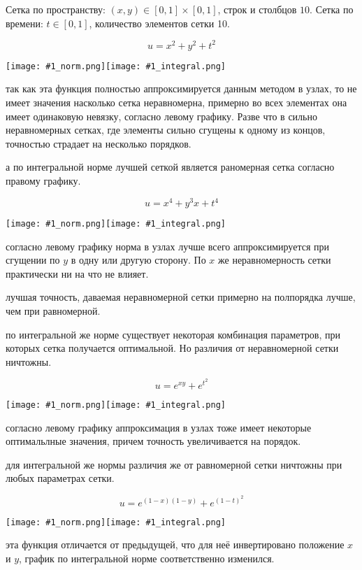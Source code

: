 Сетка по пространству: $ (x, y) \in [0, 1] \times [0, 1] $, строк и столбцов $10$. Сетка по времени: $ t \in [0, 1] $, количество элементов сетки 10.

\newcommand{\includetwoimages}[1]{
\noindent\texttt{[image: \#1\_norm.png]}\texttt{[image: \#1\_integral.png]}
}

$$ u = x^2 + y^2 + t^2 $$

\includetwoimages{space_tgrid_0}

\conclusion так как эта функция полностью аппроксимируется данным методом в узлах, то не имеет значения насколько сетка неравномерна, примерно во всех элементах она имеет одинаковую невязку, согласно левому графику. Разве что в сильно неравномерных сетках, где элементы сильно сгущены к одному из концов, точностью страдает на несколько порядков.

\conclusion а по интегральной норме лучшей сеткой является раномерная сетка согласно правому графику.

$$ u = x^4 + y^3x + t^4 $$

\includetwoimages{space_tgrid_1}

\conclusion согласно левому графику норма в узлах лучше всего аппроксимируется при сгущении по $y$ в одну или другую сторону. По $x$ же неравномерность сетки практически ни на что не влияет.

\conclusion лучшая точность, даваемая неравномерной сетки примерно на полпорядка лучше, чем при равномерной.

\conclusion по интегральной же норме существует некоторая комбинация параметров, при которых сетка получается оптимальной. Но различия от неравномерной сетки ничтожны.

$$ u = e^{xy} + e^{t^2} $$

\includetwoimages{space_tgrid_2}

\conclusion согласно левому графику аппроксимация в узлах тоже имеет некоторые оптимальлные значения, причем точность увеличивается на порядок.

\conclusion для интегральной же нормы различия же от равномерной сетки ничтожны при любых параметрах сетки.

$$ u = e^{(1-x)(1-y)} + e^{(1-t)^2} $$

\includetwoimages{space_tgrid_3}

\conclusion эта функция отличается от предыдущей, что для неё инвертировано положение $x$ и $y$, график по интегральной норме соответственно изменился.

